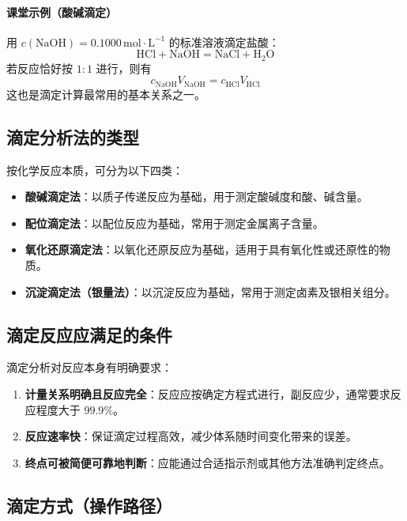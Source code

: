 \documentclass[12pt,a4paper]{article}
\numberwithin{equation}{section}
\begin{document}
\paragraph{课堂示例（酸碱滴定）}
用 $c(\mathrm{NaOH})=0.1000\,\mathrm{mol\cdot L^{-1}}$ 的标准溶液滴定盐酸：
\begin{equation}
\mathrm{HCl}+\mathrm{NaOH}=\mathrm{NaCl}+\mathrm{H_2O}
\end{equation}
若反应恰好按 $1:1$ 进行，则有
\begin{equation}
c_{\mathrm{NaOH}}V_{\mathrm{NaOH}}=c_{\mathrm{HCl}}V_{\mathrm{HCl}}
\end{equation}
这也是滴定计算最常用的基本关系之一。

\subsection{滴定分析法的类型}

按化学反应本质，可分为以下四类：
\begin{itemize}
    \item \textbf{酸碱滴定法}：以质子传递反应为基础，用于测定酸碱度和酸、碱含量。
    \item \textbf{配位滴定法}：以配位反应为基础，常用于测定金属离子含量。
    \item \textbf{氧化还原滴定法}：以氧化还原反应为基础，适用于具有氧化性或还原性的物质。
    \item \textbf{沉淀滴定法（银量法）}：以沉淀反应为基础，常用于测定卤素及银相关组分。
\end{itemize}

\subsection{滴定反应应满足的条件}

滴定分析对反应本身有明确要求：
\begin{enumerate}
    \item \textbf{计量关系明确且反应完全}：反应应按确定方程式进行，副反应少，通常要求反应程度大于 $99.9\%$。
    \item \textbf{反应速率快}：保证滴定过程高效，减少体系随时间变化带来的误差。
    \item \textbf{终点可被简便可靠地判断}：应能通过合适指示剂或其他方法准确判定终点。
\end{enumerate}

\subsection{滴定方式（操作路径）}
\end{document}
